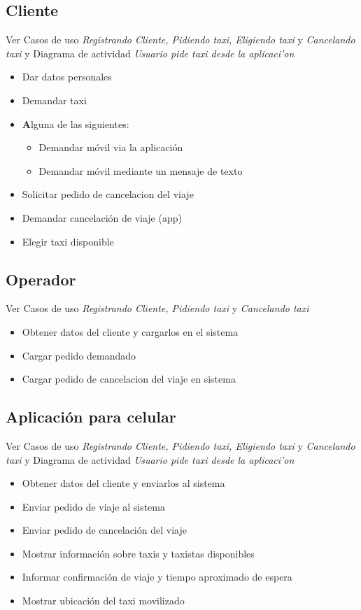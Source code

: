 \documentclass[a4paper]{article}
\begin{document}
\subsection{Cliente}
Ver Casos de uso \textit{Registrando Cliente, Pidiendo taxi, Eligiendo taxi} y \textit{Cancelando taxi} y
Diagrama de actividad \textit{Usuario pide taxi desde la aplicaci'on}
\begin{itemize}
\item Dar datos personales
\item Demandar taxi
\item \textbf Alguna de las siguientes:
	\begin{itemize}
		\item Demandar m\'ovil via la aplicaci\'on
		\item Demandar m\'ovil mediante un mensaje de texto
	\end{itemize}
\item Solicitar pedido de cancelacion del viaje
\item Demandar cancelaci\'on de viaje (app)
\item Elegir taxi disponible

\end{itemize}

\subsection{Operador}
Ver Casos de uso \textit{Registrando Cliente, Pidiendo taxi} y \textit{Cancelando taxi}
\begin{itemize}
\item Obtener datos del cliente y cargarlos en el sistema
\item Cargar pedido demandado
\item Cargar pedido de cancelacion del viaje en sistema
\end{itemize}

\subsection{Aplicaci\'on para celular}
Ver Casos de uso \textit{Registrando Cliente, Pidiendo taxi, Eligiendo taxi} y \textit{Cancelando taxi} y
Diagrama de actividad \textit{Usuario pide taxi desde la aplicaci'on}
\begin{itemize}
\item Obtener datos del cliente y enviarlos al sistema
\item Enviar pedido de viaje al sistema
\item Enviar pedido de cancelaci\'on del viaje
\item Mostrar informaci\'on sobre taxis y taxistas disponibles
\item Informar confirmaci\'on de viaje y tiempo aproximado de espera
\item Mostrar ubicaci\'on del taxi movilizado
\end{itemize}
\end{document}
